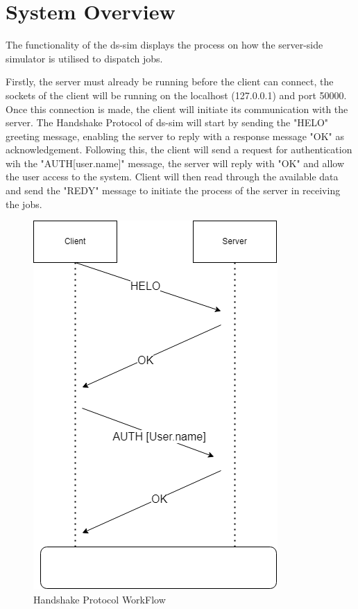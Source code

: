 \documentclass[a4paper]{article} %
\begin{document}
\section{System Overview}
\label{sec:section2}
The functionality of the ds-sim displays the process on how the server-side simulator is utilised to dispatch jobs.
\bigskip

Firstly, the server must already be running before the client can connect, the sockets of the client will be running on the localhost (127.0.0.1) and port 50000. Once this connection is made, the client will initiate its communication with the server. The Handshake Protocol of ds-sim will start by sending the "HELO" greeting message, enabling the server to reply with a response message "OK" as acknowledgement. Following this, the client will send a request for authentication wih the "AUTH[user.name]" message, the server will reply with "OK" and allow the user access to the system. Client will then read through the available data and send the "REDY" message to initiate the process of the server in receiving the jobs.
\medskip

\begin{figure}[H]
\begin{center}
\includegraphics[scale=0.3]{Client-server 1.drawio.png}
\caption{Handshake Protocol WorkFlow}
\end{center}
\end{figure}
\end{document}

